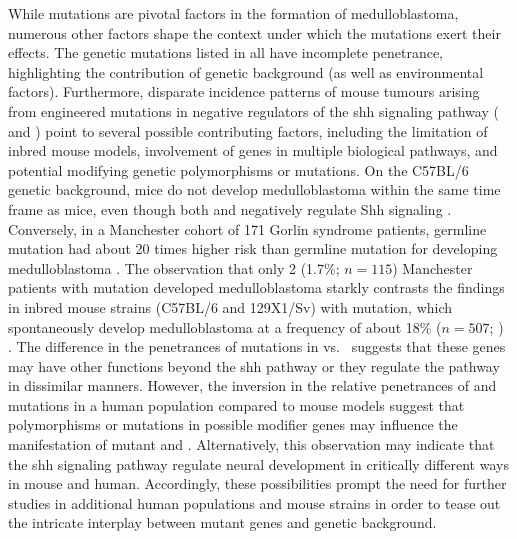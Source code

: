 While mutations are pivotal factors in the formation of medulloblastoma, numerous other factors shape the context under which the mutations exert their effects. The genetic mutations listed in  all have incomplete penetrance, highlighting the contribution of genetic background (as well as environmental factors). Furthermore, disparate incidence patterns of mouse tumours arising from engineered mutations in negative regulators of the \gls{shh} signaling pathway ( and ) point to several possible contributing factors, including the limitation of inbred mouse models, involvement of genes in multiple biological pathways, and potential modifying genetic polymorphisms or mutations. On the C57BL/6 genetic background, \high{+/-} mice do not develop medulloblastoma within the same time frame as \high{+/-} mice, even though both  and  negatively regulate Shh signaling . Conversely, in a Manchester cohort of 171 Gorlin syndrome patients, germline  mutation had about 20 times higher risk than germline  mutation for developing medulloblastoma . The observation that only 2 (1.7\%; $n = 115$) Manchester patients with  mutation developed medulloblastoma  starkly contrasts the findings in inbred mouse strains (C57BL/6 and 129X1/Sv) with  mutation, which spontaneously develop medulloblastoma at a frequency of about 18\% ($n = 507$; ) . The difference in the penetrances of mutations in  vs.\  suggests that these genes may have other functions beyond the \gls{shh} pathway or they regulate the pathway in dissimilar manners. However, the inversion in the relative penetrances of  and  mutations in a human population compared to mouse models suggest that polymorphisms or mutations in possible modifier genes may influence the manifestation of mutant  and . Alternatively, this observation may indicate that the \gls{shh} signaling pathway regulate neural development in critically different ways in mouse and human. Accordingly, these possibilities prompt the need for further studies in additional human populations and mouse strains in order to tease out the intricate interplay between mutant genes and genetic background. 

